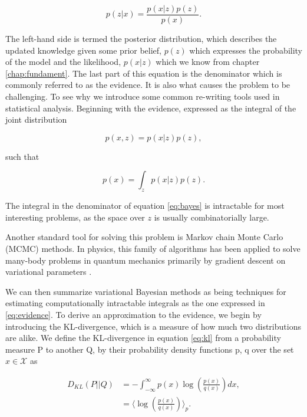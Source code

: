  \begin{equation}\label{eq:bayes}
 p(z| x) = \frac{p(x|z) p(z)}{p(x)}.
 \end{equation}

 \noindent The left-hand side is termed the posterior distribution, which describes the updated knowledge given some prior belief, $p(z)$ which expresses the probability of the model and the likelihood, $p(x|z)$ which we know from chapter \ref{chap:fundament}. The last part of this equation is the denominator which is commonly referred to as the evidence. It is also what causes the problem to be challenging. To see why we introduce some common re-writing tools used in statistical analysis. Beginning with the evidence, expressed as the integral of the joint distribution 

\begin{equation}
p(x, z) = p(x|z)p(z),
\end{equation}

\noindent such that

\begin{equation}\label{eq:evidence}
p(x) = \int_z p(x|z)p(z).
\end{equation}

\noindent The integral in the denominator of equation \ref{eq:bayes} is intractable for most interesting problems, as the space over $z$ is usually combinatorially large. 

Another standard tool for solving this problem is Markov chain Monte Carlo (MCMC) methods. In physics, this family of algorithms has been applied to solve many-body problems in quantum mechanics primarily by gradient descent on variational parameters \cite{Hjorth-Jensen}.

We can then summarize variational Bayesian methods as being techniques for estimating computationally intractable integrals as the one expressed in \ref{eq:evidence}. To derive an approximation to the evidence, we begin by introducing the KL-divergence, which is a measure of how much two distributions are alike\cite{Kullback1951}. We define the KL-divergence in equation \ref{eq:kl} from a probability measure P to another Q, by their probability density functions p, q over the set $x \in \mathcal{X}$ as

\begin{align}\label{eq:kl}
D_{KL} (P || Q) &= - \int^{\infty}_{-\infty} p(x) \log \left(\frac{p(x)}{q(x)}\right) dx, \\
&= \langle \log \left(\frac{p(x)}{q(x)} \right)\rangle_{p}.
\end{align}

